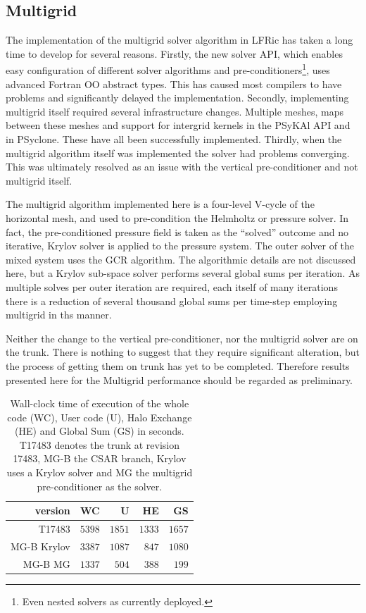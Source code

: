 \subsection{\label{sec:multigrid}Multigrid}
The implementation of the multigrid solver algorithm in LFRic has taken a
long time to develop for several reasons. Firstly, the new solver API,
which enables easy configuration of different solver algorithms and
pre-conditioners\footnote{Even nested solvers as currently deployed.},
uses advanced Fortran OO abstract types. This has caused most
compilers to have problems and significantly delayed the
implementation. Secondly, implementing multigrid itself required
several infrastructure changes. Multiple meshes, maps between these
meshes and support for intergrid kernels in the PSyKAl API and in
PSyclone. These have all been successfully implemented. Thirdly, when
the multigrid algorithm itself was implemented the solver had problems
converging.
This was ultimately resolved as an issue with the vertical
pre-conditioner and not multigrid itself. 

The multigrid algorithm implemented here is a four-level V-cycle of
the horizontal mesh, and used to pre-condition the Helmholtz or
pressure solver. In fact, the pre-conditioned pressure field is taken
as the ``solved'' outcome and no iterative, Krylov solver is applied
to the pressure system. The outer solver of the mixed system uses the
GCR algorithm. The algorithmic details are not discussed here, but a
Krylov sub-space solver performs several global sums per iteration. As
multiple solves per outer iteration are required, each itself of many
iterations there is a reduction of several thousand global sums per
time-step employing multigrid in ths manner.

Neither the change to the vertical pre-conditioner, nor the multigrid
solver are on the trunk. There is nothing to suggest that they require
significant alteration, but the process of getting them on trunk has
yet to be completed. Therefore results presented here for the
Multigrid performance should be regarded as preliminary.

\begin{table}
\centering
\caption{\label{tab:MG_data}Wall-clock time of execution of the whole code (WC), User
  code (U), Halo Exchange (HE) and Global Sum (GS) in seconds. T17483
  denotes the trunk at revision 17483, MG-B the CSAR branch,
  Krylov uses a Krylov solver and MG the multigrid pre-conditioner as
  the solver.
}
\begin{tabular}{r|rrrr}
version     & WC     & U      & HE     & GS \\\hline
T17483      & $5398$ & $1851$ & $1333$ & $1657$ \\
MG-B Krylov & $3387$ & $1087$ & $847$  & $1080$ \\
MG-B MG     & $1337$ & $504$  & $388$  & $199$ \\\hline
\end{tabular}
\end{table}

